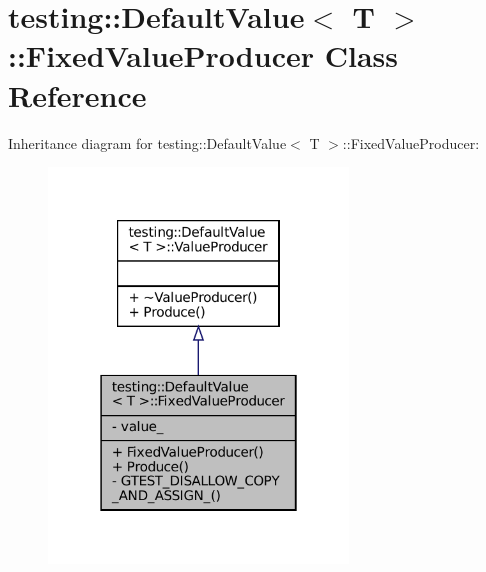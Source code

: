 \hypertarget{classtesting_1_1DefaultValue_1_1FixedValueProducer}{}\section{testing\+:\+:Default\+Value$<$ T $>$\+:\+:Fixed\+Value\+Producer Class Reference}
\label{classtesting_1_1DefaultValue_1_1FixedValueProducer}


Inheritance diagram for testing\+:\+:Default\+Value$<$ T $>$\+:\+:Fixed\+Value\+Producer\+:
\nopagebreak
\begin{figure}[H]
\begin{center}
\leavevmode
\includegraphics[width=226pt]{classtesting_1_1DefaultValue_1_1FixedValueProducer__inherit__graph}
\end{center}
\end{figure}


